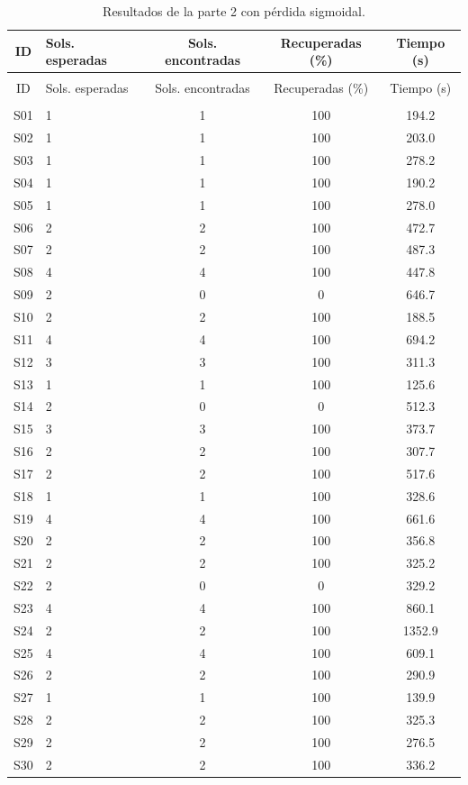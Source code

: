 \begin{longtable}{clccc} \caption{Resultados de la parte 2 con pérdida sigmoidal.}
\label{tab:resultados_sigmoid_sistemas} \\
\hline
ID & Sols. esperadas & Sols. encontradas & Recuperadas (\%) & Tiempo (s) \\
\hline \endfirsthead
\multicolumn{5}{c}{\textit{}} \\
\hline
ID & Sols. esperadas & Sols. encontradas & Recuperadas (\%) & Tiempo (s) \\
\hline \endhead \hline
\multicolumn{5}{r}{\textit{}} \\
\endfoot \hline \endlastfoot
S01 & 1 & 1 & 100 & 194.2 \\
S02 & 1 & 1 & 100 & 203.0 \\
S03 & 1 & 1 & 100 & 278.2 \\
S04 & 1 & 1 & 100 & 190.2 \\
S05 & 1 & 1 & 100 & 278.0 \\
S06 & 2 & 2 & 100 & 472.7 \\
S07 & 2 & 2 & 100 & 487.3 \\
S08 & 4 & 4 & 100 & 447.8 \\
S09 & 2 & 0 & 0 & 646.7 \\
S10 & 2 & 2 & 100 & 188.5 \\
S11 & 4 & 4 & 100 & 694.2 \\
S12 & 3 & 3 & 100 & 311.3 \\
S13 & 1 & 1 & 100 & 125.6 \\
S14 & 2 & 0 & 0 & 512.3 \\
S15 & 3 & 3 & 100 & 373.7 \\
S16 & 2 & 2 & 100 & 307.7 \\
S17 & 2 & 2 & 100 & 517.6 \\
S18 & 1 & 1 & 100 & 328.6 \\
S19 & 4 & 4 & 100 & 661.6 \\
S20 & 2 & 2 & 100 & 356.8 \\
S21 & 2 & 2 & 100 & 325.2 \\
S22 & 2 & 0 & 0 & 329.2 \\
S23 & 4 & 4 & 100 & 860.1 \\
S24 & 2 & 2 & 100 & 1352.9 \\
S25 & 4 & 4 & 100 & 609.1 \\
S26 & 2 & 2 & 100 & 290.9 \\
S27 & 1 & 1 & 100 & 139.9 \\
S28 & 2 & 2 & 100 & 325.3 \\
S29 & 2 & 2 & 100 & 276.5 \\
S30 & 2 & 2 & 100 & 336.2 \\
\end{longtable}

